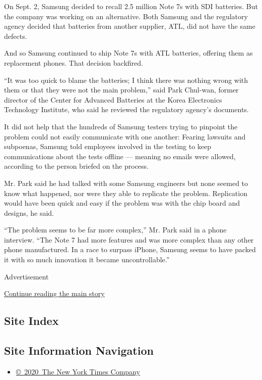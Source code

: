 On Sept. 2, Samsung decided to recall 2.5 million Note 7s with SDI
batteries. But the company was working on an alternative. Both Samsung
and the regulatory agency decided that batteries from another supplier,
ATL, did not have the same defects.

And so Samsung continued to ship Note 7s with ATL batteries, offering
them as replacement phones. That decision backfired.

``It was too quick to blame the batteries; I think there was nothing
wrong with them or that they were not the main problem,'' said Park
Chul-wan, former director of the Center for Advanced Batteries at the
Korea Electronics Technology Institute, who said he reviewed the
regulatory agency's documents.

It did not help that the hundreds of Samsung testers trying to pinpoint
the problem could not easily communicate with one another: Fearing
lawsuits and subpoenas, Samsung told employees involved in the testing
to keep communications about the tests offline --- meaning no emails
were allowed, according to the person briefed on the process.

Mr. Park said he had talked with some Samsung engineers but none seemed
to know what happened, nor were they able to replicate the problem.
Replication would have been quick and easy if the problem was with the
chip board and designs, he said.

``The problem seems to be far more complex,'' Mr. Park said in a phone
interview. ``The Note 7 had more features and was more complex than any
other phone manufactured. In a race to surpass iPhone, Samsung seems to
have packed it with so much innovation it became uncontrollable.''

Advertisement

\protect\hyperlink{after-bottom}{Continue reading the main story}

\hypertarget{site-index}{%
\subsection{Site Index}\label{site-index}}

\hypertarget{site-information-navigation}{%
\subsection{Site Information
Navigation}\label{site-information-navigation}}

\begin{itemize}
\tightlist
\item
  \href{https://help.nytimes.com/hc/en-us/articles/115014792127-Copyright-notice}{©~2020~The
  New York Times Company}
\end{itemize}

